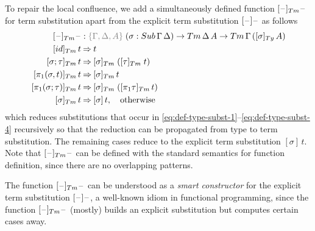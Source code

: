 \documentclass[a4paper,UKenglish,numberwithinsect,cleveref,thm-restate]{lipics-v2021}
\begin{document}
To repair the local confluence, we add a simultaneously defined function $[\blank]_{\Tm}\blank$ for term substitution apart from the explicit term substitution $[\mathord{\hspace{1pt}\text{--}\hspace{1pt}}]\mathord{\hspace{1pt}\text{--}\hspace{1pt}}$ as follows
\begin{alignat*}{3}
  [\blank]_{\Tm}\blank & : \implicit{\Gamma, \Delta, A}\;(\sigma : \Sub\,\Gamma\,\Delta) \to \Tm\,\Delta\,A \to \Tm\,\Gamma\,([\sigma]_{\Ty}\,A) \\
[ \idS ]_{\Tm}\,t          & \reduce t \\
[ \sigma ; \tau ]_{\Tm}\,t & \reduce [ \sigma ]_{\Tm}\;([ \tau ]_{\Tm}\;t) \\
[ \pi_1(\sigma, t) ]_{\Tm}\,t & \reduce [\sigma]_\Tm\,t \\
[ \pi_1(\sigma; \tau) ]_{\Tm}\,t & \reduce [\sigma]_\Tm\; ([\pi_1\tau]_\Tm \,t) \\
[ \sigma ]_{\Tm}\,t        & \reduce [ \sigma ]\,t, \quad \text{otherwise}
\end{alignat*}
which reduces substitutions that occur in \eqref{eq:def-type-subst-1}--\eqref{eq:def-type-subst-4} recursively so that the reduction can be propagated from type to term substitution.
The remaining cases reduce to the explicit term substitution $[\sigma]\,t$.
Note that $[\blank]_{\Tm}\blank$ can be defined with the standard semantics for function definition, since there are no overlapping patterns.
\begin{remark}
  The function $[\blank]_{\Tm}\blank$ can be understood as a \emph{smart constructor} for the explicit term substitution $[\mathord{\hspace{1pt}\text{--}\hspace{1pt}}]\mathord{\hspace{1pt}\text{--}\hspace{1pt}}$, a well-known idiom in functional programming, since the function $[\blank]_{\Tm}\blank$ (mostly) builds an explicit substitution but computes certain cases away.
\end{remark}
\end{document}
